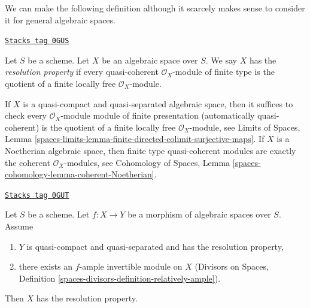 \medskip\noindent
We can make the following definition although it scarcely makes
sense to consider it for general algebraic spaces.

\begin{definition}
\label{spaces-perfect-definition-resolution-property}
\href{https://stacks.math.columbia.edu/tag/0GUS}{\texttt{Stacks tag 0GUS}}

Let $S$ be a scheme. Let $X$ be an algebraic space over $S$.
We say $X$ has the {\it resolution property} if every quasi-coherent
$\mathcal{O}_X$-module of finite type is the quotient of a
finite locally free $\mathcal{O}_X$-module.
\end{definition}

If $X$ is a quasi-compact and quasi-separated algebraic space, then
it suffices to check every $\mathcal{O}_X$-module module of
finite presentation (automatically quasi-coherent) is the quotient
of a finite locally free $\mathcal{O}_X$-module, see
Limits of Spaces, Lemma
\ref{spaces-limits-lemma-finite-directed-colimit-surjective-maps}.
If $X$ is a Noetherian algebraic space, then finite type quasi-coherent modules
are exactly the coherent $\mathcal{O}_X$-modules, see
Cohomology of Spaces, Lemma \ref{spaces-cohomology-lemma-coherent-Noetherian}.

\begin{lemma}
\label{spaces-perfect-lemma-resolution-property-ample-relative}
\href{https://stacks.math.columbia.edu/tag/0GUT}{\texttt{Stacks tag 0GUT}}

Let $S$ be a scheme.
Let $f : X \to Y$ be a morphism of algebraic spaces over $S$. Assume
\begin{enumerate}
\item $Y$ is quasi-compact and quasi-separated and has the resolution property,
\item there exists an $f$-ample invertible module on $X$
(Divisors on Spaces, Definition
\ref{spaces-divisors-definition-relatively-ample}).
\end{enumerate}
Then $X$ has the resolution property.
\end{lemma}

